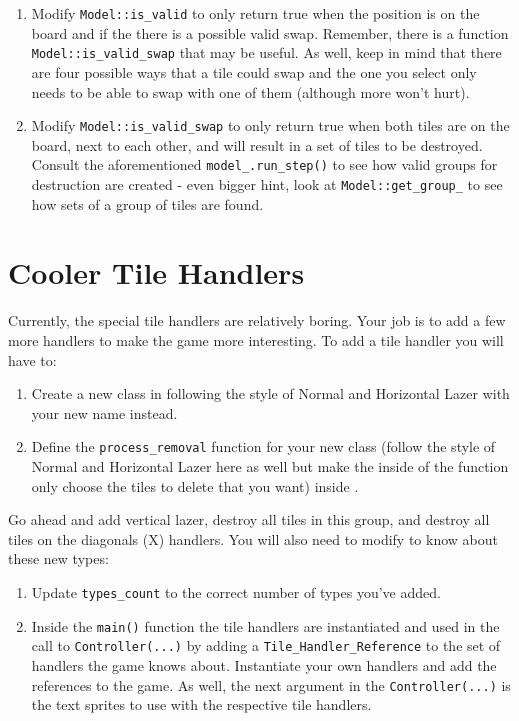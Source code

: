 \documentclass{tufte-handout}
\begin{document}
\begin{enumerate}
  \item Modify \verb!Model::is_valid! to only return true when the position is
    on the board and if the there is a possible valid swap. Remember, there is
    a function \verb!Model::is_valid_swap! that may be useful. As well, keep in
    mind that there are four possible ways that a tile could swap and the one
    you select only needs to be able to swap with one of them (although more
    won't hurt).

  \item Modify \verb!Model::is_valid_swap! to only return true when both tiles
    are on the board, next to each other, and will result in a set of tiles to
    be destroyed. Consult the aforementioned \verb!model_.run_step()! to see how
    valid groups for destruction are created - even bigger hint, look at
    \verb!Model::get_group_! to see how sets of a group of tiles are found.
\end{enumerate}

\section{Cooler Tile Handlers}

Currently, the special tile handlers are relatively boring. Your job is to add
a few more handlers to make the game more interesting. To add a tile handler
you will have to:

\begin{enumerate}
  \item Create a new class in  following the style
    of Normal and Horizontal Lazer with your new name instead.

  \item Define the \verb!process_removal! function for your new class (follow
    the style of Normal and Horizontal Lazer here as well but make the inside
    of the function only choose the tiles to delete that you want) inside
    .
\end{enumerate}

Go ahead and add vertical lazer, destroy all tiles in this group, and
destroy all tiles on the diagonals (X) handlers. You will also need to modify
 to know about these new types:

\begin{enumerate}
    \item Update \verb!types_count! to the correct number of types you've added.

    \item Inside the \verb!main()! function the tile handlers are instantiated
      and used in the call to \verb!Controller(...)! by adding a
      \verb!Tile_Handler_Reference! to the set of handlers the game knows about.
      Instantiate your own handlers and add the references to the game. As well,
      the next argument in the \verb!Controller(...)! is the text sprites to use
      with the respective tile handlers.
\end{enumerate}
\end{document}
